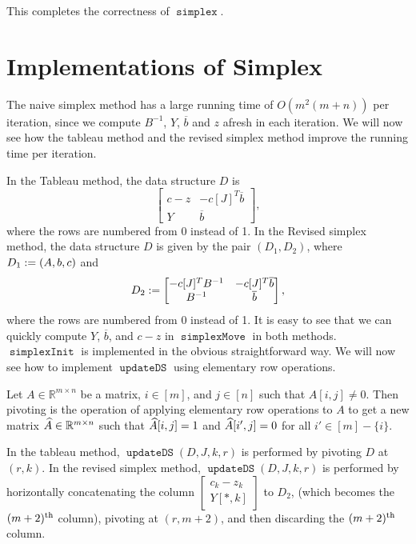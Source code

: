 \documentclass[a4paper, 12pt, fleqn]{article}
\newcommand*{\bline}{\overline{b}}
\DeclareMathOperator{\simplex}{\mathtt{simplex}}
\DeclareMathOperator{\simplexInit}{\mathtt{simplexInit}}
\DeclareMathOperator{\simplexMove}{\mathtt{simplexMove}}
\DeclareMathOperator{\updateDS}{\mathtt{updateDS}}
\begin{document}
This completes the correctness of $\simplex$.

\section{Implementations of Simplex}

The naive simplex method has a large running time of $O(m^2(m + n))$ per iteration,
since we compute $B^{-1}$, $Y$, $\bline$ and $z$ afresh in each iteration.
We will now see how the tableau method and the revised simplex method
improve the running time per iteration.

In the Tableau method, the data structure $D$ is
\[ \begin{bmatrix} c - z & -c[J]^T\bline \\[0.5em] Y & \bline \end{bmatrix}, \]
where the rows are numbered from 0 instead of 1.
In the Revised simplex method, the data structure $D$ is given by
the pair $(D_1, D_2)$, where $D_1 := (A, b, c)$ and
\[ D_2 \defeq \begin{bmatrix} -c[J]^TB^{-1} & -c[J]^T\bline \\ B^{-1} & \bline \end{bmatrix}, \]
where the rows are numbered from 0 instead of 1.
It is easy to see that we can quickly compute $Y$, $\bline$, and $c-z$
in $\simplexMove$ in both methods.
$\simplexInit$ is implemented in the obvious straightforward way.
We will now see how to implement $\updateDS$ using elementary row operations.

\begin{definition}[pivoting]
Let $A \in \mathbb{R}^{m \times n}$ be a matrix, $i \in [m]$, and $j \in [n]$
such that $A[i, j] \neq 0$. Then pivoting is the operation of applying
elementary row operations to $A$ to get a new matrix $\widehat{A} \in \mathbb{R}^{m \times n}$
such that $\widehat{A}[i, j] = 1$ and $\widehat{A}[i', j] = 0$ for all $i' \in [m] - \{i\}$.
\end{definition}

In the tableau method, $\updateDS(D, J, k, r)$ is performed by pivoting $D$ at $(r, k)$.
In the revised simplex method, $\updateDS(D, J, k, r)$ is performed by
horizontally concatenating the column
$\begin{bmatrix}c_k - z_k \\ Y[*, k] \end{bmatrix}$ to $D_2$,
(which becomes the $(m+2)^{\textrm{th}}$ column), pivoting at $(r, m+2)$,
and then discarding the $(m+2)^{\textrm{th}}$ column.
\end{document}
